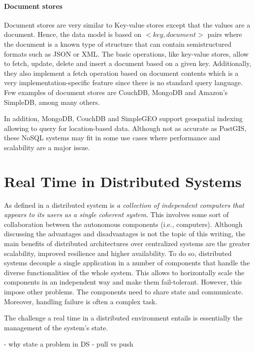 \paragraph{Document stores}

Document stores are very similar to Key-value stores except that the values are a document. Hence, the data model is based on ${<key, document>}$ pairs where the document is a known type of structure that can contain semistructured formats such as JSON or XML. The basic operations, like key-value stores, allow to fetch, update, delete and insert a document based on a given key. Additionally, they also implement a fetch operation based on document contents which is a very implementation-specific feature since there is no standard query language. Few examples of document stores are CouchDB, MongoDB and Amazon's SimpleDB, among many others.  

In addition, MongoDB, CouchDB and SimpleGEO support geospatial indexing allowing to query for location-based data. Although not as accurate as PostGIS, these NoSQL systems may fit in some use cases where performance and scalability are a major issue.

\section{Real Time in Distributed Systems}

As defined in \cite{distributed-systems-book} a distributed system is \textit{a collection of independent computers that appears to its users as a single coherent system}. This involves some sort of collaboration between the autonomous components (i.e., computers). Although discussing the advantages and disadvantages is not the topic of this writing, the main benefits of distributed architectures over centralized systems are the greater scalability, improved resilience and higher availability. To do so, distributed systems decouple a single application in a number of components that handle the diverse functionalities of the whole system. This allows to horizontally scale the components in an independent way and make them fail-tolerant. However, this impose other problems. The components need to share state and communicate. Moreover, handling failure is often a complex task.

The challenge a real time in a distributed environment entails is essentially the management of the system's state. 

- why state a problem in DS
- pull vs push

